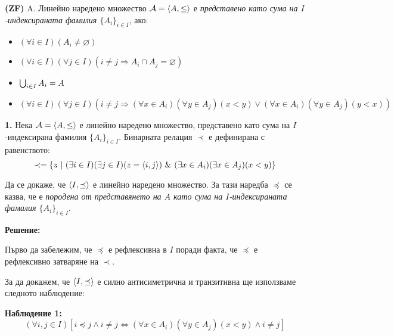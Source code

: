 \begin{problem}
\textbf{(ZF)}
A. Линейно наредено множество $\mathcal{A} = \langle A, \le \rangle$ е
\textit{представено като сума на $I$-индексираната фамилия $\{A_i\}_{i \in I}$}, ако:
\begin{itemize}
\item
$(\forall i \in I)(A_i \neq \varnothing)$
\item
$(\forall i \in I)(\forall j \in I)(i \neq j \Rightarrow A_i \cap A_j = \varnothing)$
\item
$\bigcup_{i \in I} A_i = A$
\item
$(\forall i \in I)(\forall j \in I)(i \neq j \Rightarrow (\forall x \in A_i)(\forall y \in A_j)(x < y) \lor (\forall x \in A_i)(\forall y \in A_j)(y < x))$
\end{itemize}

\quad
\textbf{1.}
Нека $\mathcal{A} = \langle A, \leq \rangle$ е линейно наредено множество,
представено като сума на $I$-индексирана фамилия $\{A_i\}_{i \in I}$.
Бинарната релация $\prec$ е дефинирана с равенството:
\[
\prec = \{z\ |\ (\exists i \in I)(\exists j \in I)(z = \pair{i, j}) \land (\exists x \in A_i)(\exists x \in A_j)(x < y)\}
\]

\quad
Да се докаже, че $\langle I, \preceq \rangle$ е линейно наредено множество.
За тази наредба $\preceq$ се казва, че е \textit{породена от представянето на $A$ като сума на
$I$-индексираната фамилия $\{A_i\}_{i \in I}$}.

\bigbreak
\textbf{Решение:}

\smallbreak
\quad
Първо да забележим, че $\preceq$ е рефлексивна в $I$ поради факта, че $\preceq$ е рефлексивно затваряне на $\prec$.

\quad
За да докажем, че $\langle I, \preceq \rangle$ е силно антисиметрична и транзитивна ще използваме следното наблюдение:

\smallbreak
\quad
\textbf{Наблюдение 1:}
\[
	(\forall i, j \in I) [i \preceq j \land i \neq j \iff (\forall x \in A_i)(\forall y \in A_j)(x < y) \land i \neq j]
\]

\begin{tcolorbox}[mybox, title={Доказателство:}]


\end{tcolorbox}
\end{problem}
